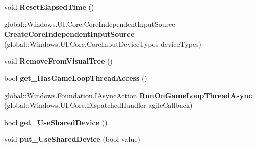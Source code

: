 \begin{DoxyCompactItemize}
void {\bfseries Reset\+Elapsed\+Time} ()
\item 
\mbox{\label{interface_microsoft_1_1_graphics_1_1_canvas_1_1_u_i_1_1_xaml_1_1_i_canvas_animated_control_a60019a5524becce29e2143af4c04fd6e}} 
global\+::\+Windows.\+U\+I.\+Core.\+Core\+Independent\+Input\+Source {\bfseries Create\+Core\+Independent\+Input\+Source} (global\+::\+Windows.\+U\+I.\+Core.\+Core\+Input\+Device\+Types device\+Types)
\item 
\mbox{\label{interface_microsoft_1_1_graphics_1_1_canvas_1_1_u_i_1_1_xaml_1_1_i_canvas_animated_control_a07c176ef557d7e5ee57dcdd022db16e6}} 
void {\bfseries Remove\+From\+Visual\+Tree} ()
\item 
\mbox{\label{interface_microsoft_1_1_graphics_1_1_canvas_1_1_u_i_1_1_xaml_1_1_i_canvas_animated_control_ab16eea1af618b2cac579d8d9f187797f}} 
bool {\bfseries get\+\_\+\+Has\+Game\+Loop\+Thread\+Access} ()
\item 
\mbox{\label{interface_microsoft_1_1_graphics_1_1_canvas_1_1_u_i_1_1_xaml_1_1_i_canvas_animated_control_ae25407f319ca08c1102170a3ffa753d2}} 
global\+::\+Windows.\+Foundation.\+I\+Async\+Action {\bfseries Run\+On\+Game\+Loop\+Thread\+Async} (global\+::\+Windows.\+U\+I.\+Core.\+Dispatched\+Handler agile\+Callback)
\item 
\mbox{\label{interface_microsoft_1_1_graphics_1_1_canvas_1_1_u_i_1_1_xaml_1_1_i_canvas_animated_control_aa05dc9e0fe80af0efbb5aa50cf3e8e0d}} 
bool {\bfseries get\+\_\+\+Use\+Shared\+Device} ()
\item 
\mbox{\label{interface_microsoft_1_1_graphics_1_1_canvas_1_1_u_i_1_1_xaml_1_1_i_canvas_animated_control_a85dcb0f62f78c8f5cae15d233c790349}} 
void {\bfseries put\+\_\+\+Use\+Shared\+Device} (bool value)
\item 

\end{DoxyCompactItemize}
